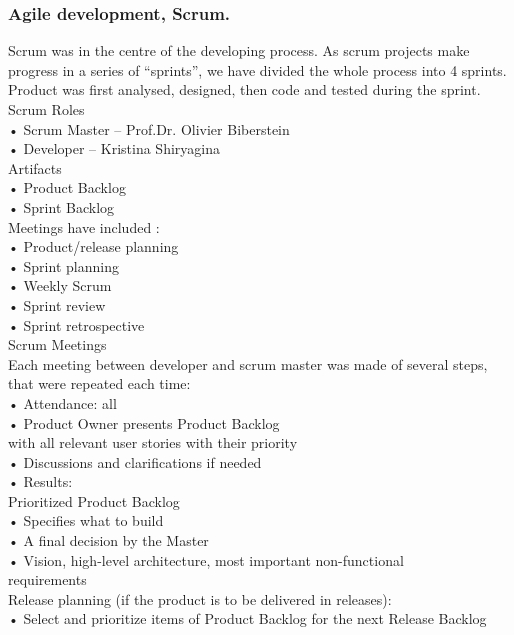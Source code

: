\documentclass{scrartcl}
\begin{document}
\subsubsection{ Agile development, Scrum.} 
Scrum was in the centre of the developing process.
As scrum projects make progress in a series of “sprints”, we have divided the whole process into
4 sprints. Product was first analysed, designed, then code and tested during the sprint. \\
Scrum
Roles \\
	•	Scrum Master – Prof.Dr. Olivier Biberstein\\
	•	Developer – Kristina Shiryagina\\
 Artifacts \\
	•	Product Backlog\\
	•	Sprint Backlog\\
 Meetings have included :\\
	•	Product/release planning\\
	•	Sprint planning\\
	•	Weekly Scrum\\
	•	Sprint review\\
	•	Sprint retrospective\\
Scrum Meetings \\
Each meeting between developer and scrum master was made of several steps, that were repeated each time:\\
	•	Attendance: all\\
	•	Product Owner presents Product Backlog\\
with all relevant user stories with their priority\\
	•	Discussions and clarifications if needed\\
	•	Results:\\
Prioritized Product Backlog\\
	•	Specifies what to build\\
	•	A final decision by the Master\\
	•	Vision, high-level architecture, most important non-functional\\
requirements\\
Release planning (if the product is to be delivered in releases):\\
	•	Select and prioritize items of Product Backlog for the next Release Backlog\\
	
	
\end{document}
